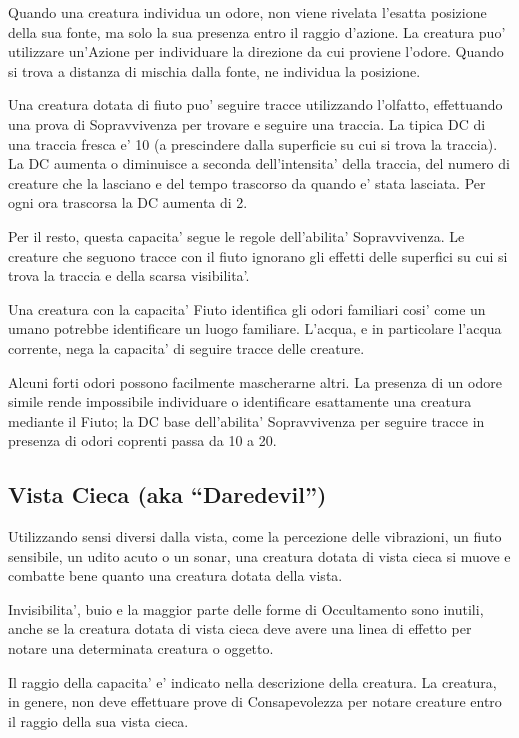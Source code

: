 \documentclass[a4paper,11pt,twoside,openany]{dndbook}
\begin{document}
Quando una creatura individua un odore, non viene rivelata l'esatta posizione della sua fonte, ma solo la sua presenza entro il raggio d'azione. La creatura puo' utilizzare un'Azione per individuare la direzione da cui proviene l'odore. Quando si trova a distanza di mischia dalla fonte, ne individua la posizione.

Una creatura dotata di fiuto puo' seguire tracce utilizzando l'olfatto, effettuando una prova di Sopravvivenza per trovare e seguire una traccia. La tipica DC di una traccia fresca e' 10 (a prescindere dalla superficie su cui si trova la traccia). La DC aumenta o diminuisce a seconda dell'intensita' della traccia, del numero di creature che la lasciano e del tempo trascorso da quando e' stata lasciata. Per ogni ora trascorsa la DC aumenta di 2.

Per il resto, questa capacita' segue le regole dell'abilita' Sopravvivenza. Le creature che seguono tracce con il fiuto ignorano gli effetti delle superfici su cui si trova la traccia e della scarsa visibilita'.

Una creatura con la capacita' Fiuto identifica gli odori familiari cosi' come un umano potrebbe identificare un luogo familiare. L'acqua, e in particolare l'acqua corrente, nega la capacita' di seguire tracce delle creature.

Alcuni forti odori possono facilmente mascherarne altri. La presenza di un odore simile rende impossibile individuare o identificare esattamente una creatura mediante il Fiuto; la DC base dell'abilita' Sopravvivenza per seguire tracce in presenza di odori coprenti passa da 10 a 20.


\subsection{Vista Cieca (aka “Daredevil”)}

Utilizzando sensi diversi dalla vista, come la percezione delle vibrazioni, un fiuto sensibile, un udito acuto o un sonar, una creatura dotata di vista cieca si muove e combatte bene quanto una creatura dotata della vista. 

Invisibilita’, buio e la maggior parte delle forme di Occultamento sono inutili, anche se la creatura dotata di vista cieca deve avere una linea di effetto per notare una determinata creatura o oggetto. 

Il raggio della capacita' e' indicato nella descrizione della creatura. La creatura, in genere, non deve effettuare prove di Consapevolezza per notare creature entro il raggio della sua vista cieca.
\end{document}
